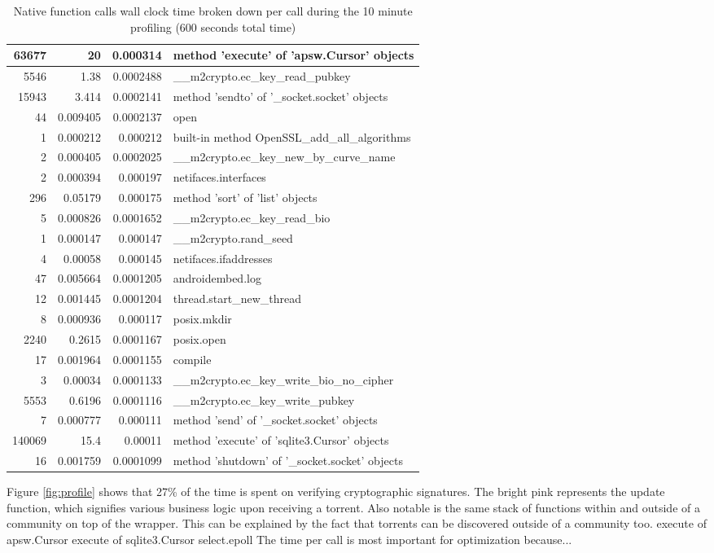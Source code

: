 \begin{table}
\begin{tabular}{*{3}{r} | l}
		63677 & 20 & 0.000314 & method 'execute' of 'apsw.Cursor' objects \\ \hline
		5546 & 1.38 & 0.0002488 & \_\_m2crypto.ec\_key\_read\_pubkey \\ \hline
		15943 & 3.414 & 0.0002141 & method 'sendto' of '\_socket.socket' objects \\ \hline
		44 & 0.009405 & 0.0002137 & open \\ \hline
		1 & 0.000212 & 0.000212 & built-in method OpenSSL\_add\_all\_algorithms \\ \hline
		2 & 0.000405 & 0.0002025 & \_\_m2crypto.ec\_key\_new\_by\_curve\_name \\ \hline
		2 & 0.000394 & 0.000197 & netifaces.interfaces \\ \hline
		296 & 0.05179 & 0.000175 & method 'sort' of 'list' objects \\ \hline
		5 & 0.000826 & 0.0001652 & \_\_m2crypto.ec\_key\_read\_bio \\ \hline
		1 & 0.000147 & 0.000147 & \_\_m2crypto.rand\_seed \\ \hline
		4 & 0.00058 & 0.000145 & netifaces.ifaddresses \\ \hline
		47 & 0.005664 & 0.0001205 & androidembed.log \\ \hline
		12 & 0.001445 & 0.0001204 & thread.start\_new\_thread \\ \hline
		8 & 0.000936 & 0.000117 & posix.mkdir \\ \hline
		2240 & 0.2615 & 0.0001167 & posix.open \\ \hline
		17 & 0.001964 & 0.0001155 & compile \\ \hline
		3 & 0.00034 & 0.0001133 & \_\_m2crypto.ec\_key\_write\_bio\_no\_cipher \\ \hline
		5553 & 0.6196 & 0.0001116 & \_\_m2crypto.ec\_key\_write\_pubkey \\ \hline
		7 & 0.000777 & 0.000111 & method 'send' of '\_socket.socket' objects \\ \hline
		140069 & 15.4 & 0.00011 & method 'execute' of 'sqlite3.Cursor' objects \\ \hline
		16 & 0.001759 & 0.0001099 & method 'shutdown' of '\_socket.socket' objects \\ \hline
	\end{tabular}
	\caption{Native function calls wall clock time broken down per call during the 10 minute profiling (600 seconds total time)}
	\label{table:profiling_details}
\end{table}
Figure \ref{fig:profile} shows that 27\% of the time is spent on verifying cryptographic signatures.
The bright pink represents the update function, which signifies various business logic upon receiving a torrent.
Also notable is the same stack of functions within and outside of a community on top of the wrapper.
This can be explained by the fact that torrents can be discovered outside of a community too.
execute of apsw.Cursor
execute of sqlite3.Cursor
select.epoll \cite{http://stackoverflow.com/questions/2032598/caveats-of-select-poll-vs-epoll-reactors-in-twisted}
The time per call is most important for optimization because...

